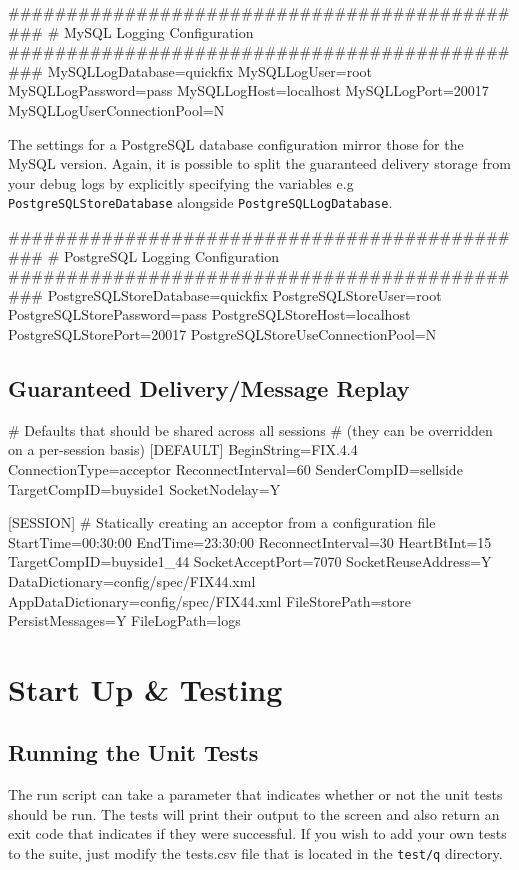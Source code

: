 \begin{inicode}
	##############################################
	#       MySQL Logging Configuration 
	##############################################
	MySQLLogDatabase=quickfix
	MySQLLogUser=root
	MySQLLogPassword=pass
	MySQLLogHost=localhost
	MySQLLogPort=20017
	MySQLLogUserConnectionPool=N
\end{inicode}

The settings for a PostgreSQL database configuration mirror those for the MySQL
version. Again, it is possible to split the guaranteed delivery storage from your
debug logs by explicitly specifying the variables e.g \verb|PostgreSQLStoreDatabase|
alongside \verb|PostgreSQLLogDatabase|.

\begin{inicode}
	##############################################
	#       PostgreSQL Logging Configuration 
	##############################################
	PostgreSQLStoreDatabase=quickfix
	PostgreSQLStoreUser=root
	PostgreSQLStorePassword=pass
	PostgreSQLStoreHost=localhost
	PostgreSQLStorePort=20017
	PostgreSQLStoreUseConnectionPool=N
\end{inicode}

\subsection{Guaranteed Delivery/Message Replay}

\begin{inicode}
	# Defaults that should be shared across all sessions
	# (they can be overridden on a per-session basis)
	[DEFAULT]
	BeginString=FIX.4.4
	ConnectionType=acceptor
	ReconnectInterval=60
	SenderCompID=sellside
	TargetCompID=buyside1
	SocketNodelay=Y
	
	[SESSION]
	# Statically creating an acceptor from a configuration file
	StartTime=00:30:00
	EndTime=23:30:00
	ReconnectInterval=30
	HeartBtInt=15
	TargetCompID=buyside1_44
	SocketAcceptPort=7070
	SocketReuseAddress=Y
	DataDictionary=config/spec/FIX44.xml
	AppDataDictionary=config/spec/FIX44.xml
	FileStorePath=store
	PersistMessages=Y
	FileLogPath=logs
\end{inicode}

\section{Start Up \& Testing}

\subsection{Running the Unit Tests}
The run script can take a parameter that indicates whether or not the unit tests should be run. The tests
will print their output to the screen and also return an exit code that indicates if they were successful.
If you wish to add your own tests to the suite, just modify the tests.csv file that is located in the 
\verb|test/q| directory.

